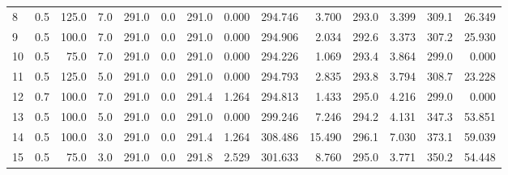 \begin{tabular}{lrrrrrrrrrrrrr}
8  & 0.5    & 125.0 & 7.0     & 291.0                                            & 0.0                                & 291.0                             & 0.000                               & 294.746 & 3.700    & 293.0 & 3.399    & 309.1 & 26.349   \\
9  & 0.5    & 100.0 & 7.0     & 291.0                                            & 0.0                                & 291.0                             & 0.000                               & 294.906 & 2.034    & 292.6 & 3.373    & 307.2 & 25.930   \\
10  & 0.5    & 75.0  & 7.0     & 291.0                                            & 0.0                                & 291.0                             & 0.000                               & 294.226 & 1.069    & 293.4 & 3.864    & 299.0 & 0.000    \\
11 & 0.5    & 125.0 & 5.0     & 291.0                                            & 0.0                                & 291.0                             & 0.000                               & 294.793 & 2.835    & 293.8 & 3.794    & 308.7 & 23.228   \\
12 & 0.7    & 100.0 & 7.0     & 291.0                                            & 0.0                                & 291.4                             & 1.264                               & 294.813 & 1.433    & 295.0 & 4.216    & 299.0 & 0.000    \\
13 & 0.5    & 100.0 & 5.0     & 291.0                                            & 0.0                                & 291.0                             & 0.000                               & 299.246 & 7.246    & 294.2 & 4.131    & 347.3 & 53.851   \\
14 & 0.5    & 100.0 & 3.0     & 291.0                                            & 0.0                                & 291.4                             & 1.264                               & 308.486 & 15.490   & 296.1 & 7.030    & 373.1 & 59.039   \\
15 & 0.5    & 75.0  & 3.0     & 291.0                                            & 0.0                                & 291.8                             & 2.529                               & 301.633 & 8.760    & 295.0 & 3.771    & 350.2 & 54.448   \\
\bottomrule
\end{tabular}
